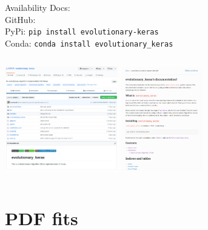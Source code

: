 \begin{frame}{Availability}
Docs: \href{http://evolutionary-keras.readthedocs.io/en/latest/}{}\\
GitHub: \href{http://www.github.com/N3PDF/evolutionary_keras}{}\\
PyPi: \texttt{pip install evolutionary-keras}\\
Conda: \texttt{conda install evolutionary\_keras}

\vspace{15pt}
\begin{columns}[onlytextwidth]
\centering
\includegraphics[height=130pt]{Screenshot_github.png}  
\centering
\includegraphics[height=130pt]{screenshot_readthedocs.png}
\end{columns}


\end{frame}

\section{PDF fits}

